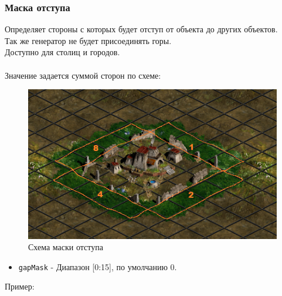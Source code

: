 \subsubsection{Маска отступа}
\label{gapMask}

Определяет стороны с которых будет отступ от объекта до других объектов.\\
Так же генератор не будет присоединять горы.\\
Доступно для столиц и городов.\\\\
Значение задается суммой сторон по схеме:

\begin{figure}[H]
\center
\includegraphics[width=.8\linewidth]{docImages/gapMask1.png}
\caption{Схема маски отступа}
\end{figure}

\begin{itemize}
\item \texttt{gapMask} - Диапазон [0:15], по умолчанию 0.
\end{itemize}

Пример:
\begin{figure}[H]

\end{figure}